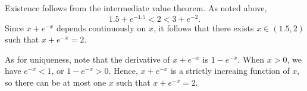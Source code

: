 \documentclass[12pt]{article}
\begin{document}
Existence follows from the intermediate value theorem.  As
noted above, 
\[
1.5 + e^{-1.5} < 2 < 3 + e^{-2}.
\]
Since $x + e^{-x}$ depends continuously on $x$, it follows 
that there exists $x \in (1.5, 2)$ such that $x + e^{-x} = 2$.

As for uniqueness, note that the derivative of $x + e^{-x}$
is $1 - e^{-x}$.  When $x > 0$, we have $e^{-x} < 1$, or
$1 - e^{-x} > 0$.  Hence, $x + e^{-x}$ is a strictly increaing
function of $x$, so there can be at most one $x$ such that
$x + e^{-x} = 2$.

\end{document}
